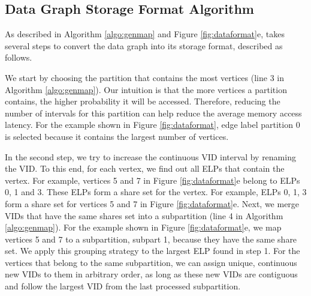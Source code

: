 \subsection{Data Graph Storage Format Algorithm}

 As described in Algorithm \ref{algo:genmap} and Figure \ref{fig:dataformat}e, \SystemName takes
several steps to convert the data graph into its storage format, described as follows.

 We start by choosing the partition that contains the most vertices (line 3 in Algorithm
\ref{algo:genmap}). Our intuition is that the more vertices a partition contains, the higher probability it will be accessed. Therefore,
reducing the number of intervals for this partition can help reduce the average memory access latency. For the example shown in Figure
\ref{fig:dataformat}, edge label partition 0 is selected because it contains the largest number of vertices.

 In the second step, we try to increase the continuous VID interval by renaming the VID. To this end, for
each vertex, we find out all ELPs that contain the vertex. For example, vertices 5 and 7 in Figure \ref{fig:dataformat}e belong to ELPs 0,
1 and 3. These ELPs form a share set for the vertex. For example, ELPs 0, 1, 3 form a share set for vertices 5 and 7 in Figure
\ref{fig:dataformat}e. Next, we merge VIDs that have the same shares set into a subpartition (line 4 in Algorithm \ref{algo:genmap}). For
the example shown in Figure \ref{fig:dataformat}e, we map vertices 5 and 7 to a subpartition, subpart 1, because they have the same share
set. We apply this grouping strategy to the largest ELP found in step 1. For the vertices that belong to the same subpartition, we can
assign unique, continuous new VIDs to them in arbitrary order, as long as these new VIDs are contiguous and follow the largest VID from the
last processed subpartition.

